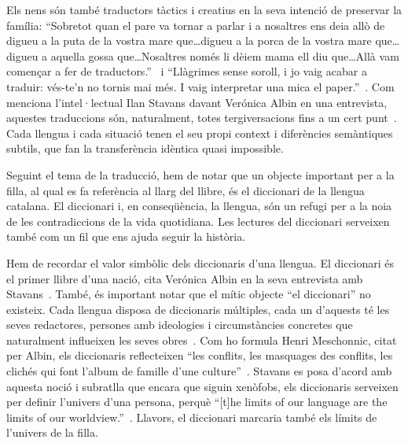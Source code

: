 Els nens són també traductors tàctics i creatius en la seva intenció de preservar la família:
``Sobretot quan el pare va tornar a parlar i a nosaltres ens deia allò de digueu a la puta de la vostra mare que\ldots digueu a la porca de la vostra mare que\ldots digueu a aquella gossa que\ldots Nosaltres només li dèiem mama ell diu que\ldots Allà vam començar a fer de traductors.''~\autocite[177]{ElHachmi2008}
i ``Llàgrimes sense soroll, i jo vaig acabar a traduir: vés-te'n  no tornis mai més. I vaig interpretar una mica el paper.''~\autocite[223--224]{ElHachmi2008}.
Com menciona l'intel·lectual Ilan Stavans davant Verónica Albin en una entrevista, aquestes traduccions són, naturalment, totes tergiversacions fins a un cert punt~\autocite{Albin2005}.
Cada llengua i cada situació tenen el seu propi context i diferències semàntiques subtils, que fan la transferència idèntica quasi impossible.

Seguint el tema de la traducció, hem de notar que
un objecte important per a la filla, al qual es fa referència al llarg del llibre, és el diccionari de la llengua catalana.
El diccionari i, en conseqüència, la llengua, són un refugi per a la noia de les contradiccions de la vida quotidiana.
Les lectures del diccionari serveixen també com un fil que ens ajuda seguir la història.

Hem de recordar el valor simbòlic dels diccionaris d'una llengua.
El diccionari és el primer llibre d'una nació, cita Verónica Albin en la seva entrevista amb Stavans~\autocite{Albin2005}.
També, és important notar que el mític objecte ``el diccionari'' no existeix.
Cada llengua disposa de diccionaris múltiples, cada un d'aquests té les seves redactores, persones amb ideologies i circumstàncies concretes que naturalment influeixen les seves obres~\autocite{Albin2005}.
Com ho formula Henri Meschonnic, citat per Albin, els diccionaris reflecteixen ``les conflits, les masquages des
conflits, les clichés qui font l'album de famille d'une culture''~\autocite{Albin2005}.
Stavans es posa d'acord amb aquesta noció i subratlla que encara que siguin xenòfobs, els diccionaris serveixen per definir l'univers d'una persona,
perquè ``[t]he limits of our language are the limits of our worldview.''~\autocite{Albin2005}.
Llavors, el diccionari marcaria també els límits de l'univers de la filla.

